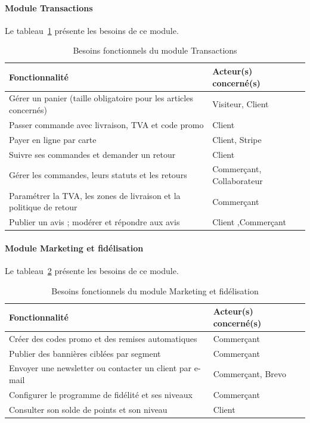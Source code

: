 \paragraph{Module Transactions}
Le tableau~\ref{tab:besoins-transactions} présente les besoins de ce module.
\begin{table}[H]
\centering
\renewcommand{\arraystretch}{1.3}
\begin{tabular}{|p{9.5cm}|p{5.5cm}|}
\hline
\textbf{Fonctionnalité} & \textbf{Acteur(s) concerné(s)} \\
\hline
Gérer un panier (taille obligatoire pour les articles concernés) & Visiteur, Client \\
\hline
Passer commande avec livraison, TVA et code promo & Client \\
\hline
Payer en ligne par carte  & Client, Stripe \\
\hline
Suivre ses commandes et demander un retour & Client \\
\hline
Gérer les commandes, leurs statuts et les retours & Commerçant, Collaborateur \\
\hline
Paramétrer la TVA, les zones de livraison et la politique de retour & Commerçant \\
\hline
Publier un avis ; modérer et répondre aux avis & Client ,Commerçant \\
\hline
\end{tabular}
\caption{Besoins fonctionnels du module Transactions}
\label{tab:besoins-transactions}
\end{table}

\paragraph{Module Marketing et fidélisation}
Le tableau~\ref{tab:besoins-marketing} présente les besoins de ce module.
\begin{table}[H]
\centering
\renewcommand{\arraystretch}{1.3}
\begin{tabular}{|p{9.5cm}|p{5.5cm}|}
\hline
\textbf{Fonctionnalité} & \textbf{Acteur(s) concerné(s)} \\
\hline
Créer des codes promo et des remises automatiques & Commerçant \\
\hline
Publier des bannières ciblées par segment & Commerçant \\
\hline
Envoyer une newsletter ou contacter un client par e-mail & Commerçant, Brevo \\
\hline
Configurer le programme de fidélité et ses niveaux & Commerçant \\
\hline
Consulter son solde de points et son niveau & Client \\
\hline
\end{tabular}
\caption{Besoins fonctionnels du module Marketing et fidélisation}
\label{tab:besoins-marketing}
\end{table}

